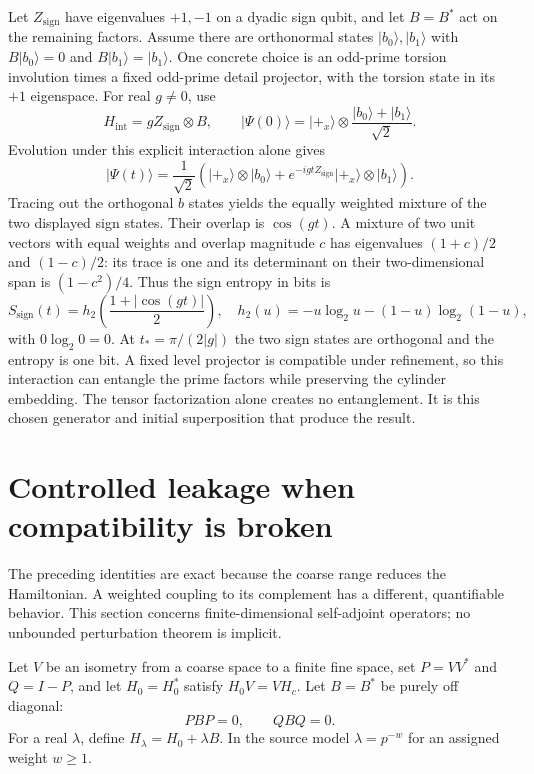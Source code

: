 Let $Z_{\mathrm{sign}}$ have eigenvalues $+1,-1$ on a dyadic sign qubit,
and let $B=B^*$ act on the remaining factors. Assume there are orthonormal
states $|b_0\rangle,|b_1\rangle$ with
$B|b_0\rangle=0$ and $B|b_1\rangle=|b_1\rangle$.
One concrete choice is an odd-prime torsion involution times a fixed
odd-prime detail projector, with the torsion state in its $+1$ eigenspace.
For real $g\neq0$, use
\[
 H_{\mathrm{int}}=gZ_{\mathrm{sign}}\otimes B,
 \qquad
 |\Psi(0)\rangle=|+_x\rangle\otimes
 \frac{|b_0\rangle+|b_1\rangle}{\sqrt2}.
\]
Evolution under this explicit interaction alone gives
\begin{equation}
 |\Psi(t)\rangle=\frac1{\sqrt2}
 \left(|+_x\rangle\otimes|b_0\rangle
 +e^{-igtZ_{\mathrm{sign}}}|+_x\rangle\otimes|b_1\rangle\right).
 \label{a-limit-entangled-state}
\end{equation}
Tracing out the orthogonal $b$ states yields the equally weighted mixture
of the two displayed sign states. Their overlap is $\cos(gt)$.
A mixture of two unit vectors with equal weights and overlap magnitude
$c$ has eigenvalues $(1+c)/2$ and $(1-c)/2$: its trace is one and its
determinant on their two-dimensional span is $(1-c^2)/4$.
Thus the sign entropy in bits is
\begin{equation}
 S_{\mathrm{sign}}(t)
 =h_2\left(\frac{1+|\cos(gt)|}{2}\right),
 \quad h_2(u)=-u\log_2u-(1-u)\log_2(1-u),
 \label{a-limit-entanglement-entropy}
\end{equation}
with $0\log_2 0=0$. At $t_* =\pi/(2|g|)$ the two sign states are
orthogonal and the entropy is one bit. A fixed level projector is
compatible under refinement, so this interaction can entangle the prime
factors while preserving the cylinder embedding.
The tensor factorization alone creates no entanglement. It is this
chosen generator and initial superposition that produce the result.


\section{Controlled leakage when compatibility is broken}
\label{a-limit-leakage}

The preceding identities are exact because the coarse range reduces the
Hamiltonian. A weighted coupling to its complement has a different,
quantifiable behavior. This section concerns finite-dimensional
self-adjoint operators; no unbounded perturbation theorem is implicit.

Let $V$ be an isometry from a coarse space to a finite fine space, set
$P=VV^*$ and $Q=I-P$, and let $H_0=H_0^*$ satisfy
$H_0V=VH_c$. Let $B=B^*$ be purely off diagonal:
\[
 PBP=0,\qquad QBQ=0.
\]
For a real $\lambda$, define $H_\lambda=H_0+\lambda B$. In the source
model $\lambda=p^{-w}$ for an assigned weight $w\geq1$.

